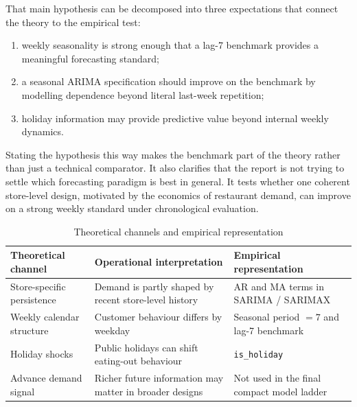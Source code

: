 \documentclass[11pt,oneside]{scrartcl}
\begin{document}
That main hypothesis can be decomposed into three expectations that connect the theory to the empirical test:
\begin{enumerate}[label=H\arabic*:,leftmargin=2.5em]
  \item weekly seasonality is strong enough that a lag-7 benchmark provides a meaningful forecasting standard;
  \item a seasonal ARIMA specification should improve on the benchmark by modelling dependence beyond literal last-week repetition;
  \item holiday information may provide predictive value beyond internal weekly dynamics.
\end{enumerate}

Stating the hypothesis this way makes the benchmark part of the theory rather than just a technical comparator. It also clarifies that the report is not trying to settle which forecasting paradigm is best in general. It tests whether one coherent store-level design, motivated by the economics of restaurant demand, can improve on a strong weekly standard under chronological evaluation.

\begin{table}[H]
\centering
\caption{Theoretical channels and empirical representation}
\begin{tabularx}{\textwidth}{>{\raggedright\arraybackslash}p{} >{\raggedright\arraybackslash}p{} >{\raggedright\arraybackslash}X}
\toprule
Theoretical channel & Operational interpretation & Empirical representation \\
\midrule
Store-specific persistence & Demand is partly shaped by recent store-level history & AR and MA terms in SARIMA / SARIMAX \\
Weekly calendar structure & Customer behaviour differs by weekday & Seasonal period $= 7$ and lag-7 benchmark \\
Holiday shocks & Public holidays can shift eating-out behaviour & \texttt{is\_holiday} \\
Advance demand signal & Richer future information may matter in broader designs & Not used in the final compact model ladder \\
\bottomrule
\end{tabularx}
\end{table}
\end{document}

